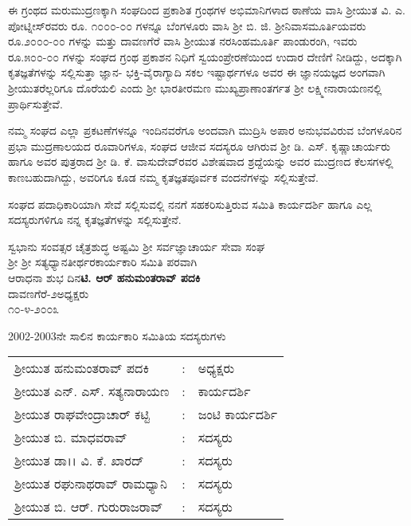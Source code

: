 ಈ ಗ್ರಂಥದ ಮರುಮುದ್ರಣಕ್ಕಾಗಿ ಸಂಘದಿಂದ ಪ್ರಕಾಶಿತ ಗ್ರಂಥಗಳ ಅಭಿಮಾನಿಗಳಾದ ಠಾಣೆಯ ವಾಸಿ ಶ‍್ರೀಯುತ ವಿ. ಎ. ಪೋಟ್ನೀಸ್‌ರವರು ರೂ. ೧೦೦೦-೦೦ ಗಳನ್ನೂ ಬೆಂಗಳೂರು ವಾಸಿ ಶ‍್ರೀ ಬಿ. ಜಿ. ಶ‍್ರೀನಿವಾಸಮೂರ್ತಿಯವರು ರೂ.೨೦೦೦-೦೦ ಗಳನ್ನು ಮತ್ತು ದಾವಣಗೆರೆ ವಾಸಿ ಶ‍್ರೀಯುತ ನರಸಿಂಹಮೂರ್ತಿ ಪಾಂಡುರಂಗಿ, ಇವರು ರೂ.\break ೫೦೦-೦೦ ಗಳನ್ನು ಸಂಘದ ಗ್ರಂಥ ಪ್ರಕಾಶನ ನಿಧಿಗೆ ಸ್ವಯಂಪ್ರೇರಣೆಯಿಂದ ಉದಾರ ದೇಣಿಗೆ ನೀಡಿದ್ದು, ಅದಕ್ಕಾಗಿ ಕೃತಜ್ಞತೆಗಳನ್ನು ಸಲ್ಲಿಸುತ್ತಾ ಜ್ಞಾನ- ಭಕ್ತಿ-ವೈರಾಗ್ಯಾದಿ ಸಕಲ ಇಷ್ಟಾರ್ಥ\-ಗಳೂ ಅವರ ಈ ಜ್ಞಾನಯಜ್ಞದ ಅಂಗವಾಗಿ ಶ‍್ರೀಯುತರೆಲ್ಲರಿಗೂ ದೊರೆಯಲಿ ಎಂದು ಶ‍್ರೀ ಭಾರತೀರಮಣ ಮುಖ್ಯಪ್ರಾಣಾಂತರ್ಗತ ಶ‍್ರೀ ಲಕ್ಷ್ಮೀನಾರಾಯಣನಲ್ಲಿ ಪ್ರಾರ್ಥಿಸುತ್ತೇವೆ.

ನಮ್ಮ ಸಂಘದ ಎಲ್ಲಾ ಪ್ರಕಟಣೆಗಳನ್ನೂ ಇಂದಿನವರೆಗೂ ಅಂದವಾಗಿ ಮುದ್ರಿಸಿ ಅಪಾರ ಅನುಭವವಿರುವ ಬೆಂಗಳೂರಿನ ಪ್ರಭಾ ಮುದ್ರಣಾಲಯದ ರೂವಾರಿಗಳೂ, ಸಂಘದ ಆಜೀವ ಸದಸ್ಯರೂ ಆಗಿರುವ ಶ‍್ರೀ ಡಿ. ಎಸ್. ಕೃಷ್ಣಾಚಾರ್ಯರು ಹಾಗೂ ಅವರ ಪುತ್ರರಾದ ಶ‍್ರೀ ಡಿ. ಕೆ. ವಾಸುದೇವ್‌ರವರ ವಿಶೇಷವಾದ ಶ್ರದ್ದೆಯನ್ನು ಅವರ ಮುದ್ರಣದ ಕೆಲಸಗಳಲ್ಲಿ ಕಾಣಬಹುದಾಗಿದ್ದು, ಅವರಿಗೂ ಕೂಡ ನಮ್ಮ ಕೃತಜ್ಞತಪೂರ್ವಕ ವಂದನೆಗಳನ್ನು ಸಲ್ಲಿಸುತ್ತೇವೆ.

ಸಂಘದ ಪದಾಧಿಕಾರಿಯಾಗಿ ಸೇವೆ ಸಲ್ಲಿಸುವಲ್ಲಿ ನನಗೆ ಸಹಕರಿಸುತ್ತಿರುವ ಸಮಿತಿ ಕಾರ್ಯದರ್ಶಿ ಹಾಗೂ ಎಲ್ಲ ಸದಸ್ಯರುಗಳಿಗೂ ನನ್ನ ಕೃತಜ್ಞತೆಗಳನ್ನು ಸಲ್ಲಿಸುತ್ತೇನೆ.

\vskip 1cm

\noindent
ಸ್ವಭಾನು ಸಂವತ್ಸರ ಚೈತ್ರಶುದ್ಧ ಅಷ್ಟಮಿ \hfill ಶ‍್ರೀ ಸರ್ವಜ್ಞಾಚಾರ್ಯ ಸೇವಾ ಸಂಘ\\ ಶ‍್ರೀ ಶ‍್ರೀ ಸತ್ಯಧ್ಯಾನತೀರ್ಥರ\hfill ಕಾರ್ಯಕಾರಿ ಸಮಿತಿ ಪರವಾಗಿ\\ ಆರಾಧನಾ ಶುಭ ದಿನ\hfill \textbf{ಟಿ. ಆರ್ ಹನುಮಂತರಾವ್ ಪದಕಿ}\\ ದಾವಣಗೆರೆ-೨\hfill ಅಧ್ಯಕ್ಷರು\\ ೧೦-೪-೨೦೦೩

\vskip 1.5cm

\begin{center}
2002-2003ನೇ ಸಾಲಿನ ಕಾರ್ಯಕಾರಿ ಸಮಿತಿಯ ಸದಸ್ಯರುಗಳು
\end{center}

\begin{longtable}{lcl}
ಶ್ರೀಯುತ ಹನುಮಂತರಾವ್ ಪದಕಿ & : & ಅಧ್ಯಕ್ಷರು \\
ಶ್ರೀಯುತ ಎನ್. ಎಸ್. ಸತ್ಯನಾರಾಯಣ & : & ಕಾರ್ಯದರ್ಶಿ \\
ಶ್ರೀಯುತ ರಾಘವೇಂದ್ರಾಚಾರ್ ಕಟ್ಟಿ & : & ಜಂಟಿ ಕಾರ್ಯದರ್ಶಿ \\
ಶ್ರೀಯುತ ಬಿ. ಮಾಧವರಾವ್ & : & ಸದಸ್ಯರು \\
ಶ್ರೀಯುತ ಡಾ।। ವಿ. ಕೆ. ಖಾರದ್ & : & ಸದಸ್ಯರು \\
ಶ್ರೀಯುತ ರಘುನಾಥರಾವ್ ರಾಮಧ್ಯಾನಿ & : & ಸದಸ್ಯರು \\
ಶ್ರೀಯುತ ಬಿ. ಆರ್. ಗುರುರಾಜರಾವ್ & : & ಸದಸ್ಯರು \\
\end{longtable}

